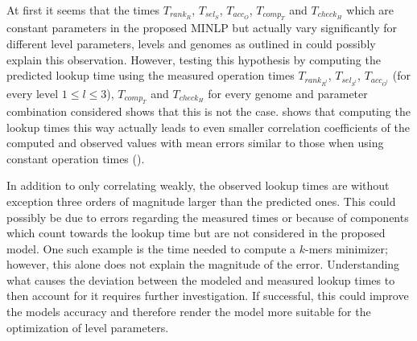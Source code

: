 \documentclass[a4paper,titlepage,onecolumn,oneside,12pt,nenglish,titlepage=firstiscover]{scrbook}
\theoremstyle{plain} %
\theoremstyle{definition} %
\theoremstyle{remark} %
\theoremstyle{plain}
\newcommand{\level}{l}
\newcommand{\access}{acc}
\newcommand{\contains}{rank}
\newcommand{\select}{sel}
\newcommand{\compare}{comp}
\newcommand{\timeForOperationOnStructure}[2]{T_{#1_{#2}}} %
\begin{document}
At first it seems that the times $\timeForOperationOnStructure{\contains}{R}$,
$\timeForOperationOnStructure{\select}{S}$,
$\timeForOperationOnStructure{\access}{O}$,
$\timeForOperationOnStructure{\compare}{T}$ and
$\timeForOperationOnStructure{check}{H}$ which are constant parameters in the proposed MINLP but actually vary significantly for different level parameters, levels and genomes as outlined in  could possibly explain this observation. However, testing this hypothesis by computing the predicted lookup time using the measured operation times $\timeForOperationOnStructure{\contains}{R^\level}$,
$\timeForOperationOnStructure{\select}{S^\level}$,
$\timeForOperationOnStructure{\access}{O^\level}$ (for every level $1 \leq \level \leq 3$),
$\timeForOperationOnStructure{\compare}{T}$ and
$\timeForOperationOnStructure{check}{H}$ for every genome and parameter combination considered shows that this is not the case.  shows that computing the lookup times this way actually leads to even smaller correlation coefficients of the computed and observed values with mean errors similar to those when using constant operation times ().\\
\begin{table}[h]
	\centering
	
	\caption{Evaluation of the lookup times computed using the measured times $\timeForOperationOnStructure{\contains}{R^\level}$,
		$\timeForOperationOnStructure{\select}{S^\level}$,
		$\timeForOperationOnStructure{\access}{O^\level}$ (for every level $1 \leq \level \leq 3$),
		$\timeForOperationOnStructure{\compare}{T}$ and
		$\timeForOperationOnStructure{check}{H}$ instead of the proposed constant ones for every genome and parameter combination considered. All values have been rounded to four significant figures. The tables show the predicted values $Pred$ compared against the observed ones $Obs$.} 
	\label{tab:WITH_MEASURED_OPERATION_TIMES_lookupTimeOverview}
\end{table}

In addition to only correlating weakly, the observed lookup times are without exception three orders of magnitude larger than the predicted ones. This could possibly be due to errors regarding the measured times or because of components which count towards the lookup time but are not considered in the proposed model. One such example is the time needed to compute a $k$-mers minimizer; however, this alone does not explain the magnitude of the error. Understanding what causes the deviation between the modeled and measured lookup times to then account for it requires further investigation. If successful, this could improve the models accuracy and therefore render the model more suitable for the optimization of level parameters.
\end{document}
